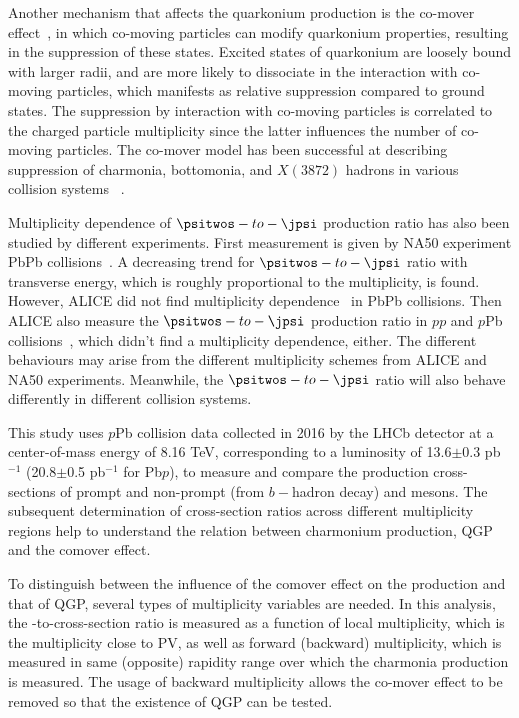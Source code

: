 Another mechanism that affects the quarkonium production is the co-mover effect~\cite{Ferreiro:2012rq}, in which co-moving particles can modify quarkonium properties, resulting in the suppression of these states. Excited states of quarkonium are loosely bound with larger radii, and are more likely to dissociate in the interaction with co-moving particles, which manifests as relative suppression compared to ground states. The suppression by interaction with co-moving particles is correlated to the charged particle multiplicity since the latter influences the number of co-moving particles. The co-mover model has been successful at describing suppression of charmonia, bottomonia, and $X(3872)$ hadrons in various collision systems ~\cite{Gavin:1996yd,Ferreiro:2018wbd,Esposito:2020ywk,Braaten:2020iqw}. 

Multiplicity dependence of $\psitwos-to-\jpsi$ production ratio has also been studied by different experiments. First measurement is given by NA50 experiment PbPb collisions~\cite{NA50:2006yzz}. A decreasing trend for $\psitwos-to-\jpsi$ ratio with transverse energy, which is roughly proportional to the multiplicity, is found. However, ALICE did not find multiplicity dependence~\cite{Hushnud:2023kwf} in PbPb collisions. Then ALICE also measure the $\psitwos-to-\jpsi$ production ratio in $pp$ and $p$Pb collisions~\cite{ALICE:2022gpu}, which didn't find a multiplicity dependence, either. The different behaviours may arise from the different multiplicity schemes from ALICE and NA50 experiments. Meanwhile, the  $\psitwos-to-\jpsi$ ratio will also behave differently in different collision systems. 

This study uses $p$Pb collision data collected in 2016 by the LHCb detector at a center-of-mass energy of 8.16 TeV, corresponding to a luminosity of 13.6$\pm$0.3 pb$^{-1}$ (20.8$\pm$0.5 pb$^{-1}$ for Pb$p$), to measure and compare the production cross-sections of prompt and non-prompt (from $b-$hadron decay) \psitwos and \jpsi mesons.  The subsequent determination of cross-section ratios across different multiplicity regions help to understand the relation between charmonium production, QGP and the comover effect. 

To distinguish between the influence of the comover effect on the production and that of QGP, several types of multiplicity variables are needed. In this analysis, the \psitwos-to-\jpsi cross-section ratio is measured as a function of local multiplicity, which is the multiplicity close to PV, as well as forward (backward) multiplicity, which is measured in same (opposite) rapidity range over which the charmonia production is measured. The usage of backward multiplicity allows the co-mover effect to be removed so that the existence of QGP can be tested.